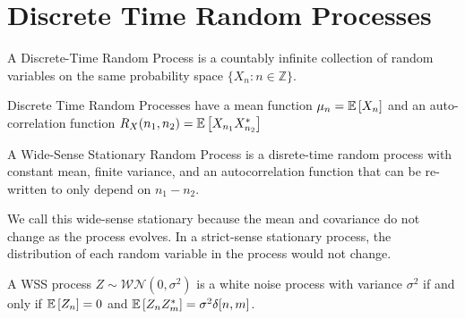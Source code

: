 \section{Discrete Time Random Processes}
\begin{definition}
	A Discrete-Time Random Process is a countably infinite collection of random variables on the same probability space $\{X_n: n\in\mathbb{Z}\}$.
	\label{defn:discrete-time-rp}
\end{definition}
Discrete Time Random Processes have a mean function $\mu_n = \mathbb{E}\left[X_n\right]$ and an auto-correlation function $R_X(n_1, n_2) = \mathbb{E}\left[X_{n_1}X_{n_2}^*\right]$
\begin{definition}
	A Wide-Sense Stationary Random Process is a disrete-time random process with constant mean, finite variance, and an autocorrelation function that can be re-written to only depend on $n_1-n_2$.
	\label{defn:wss-process}
\end{definition}
We call this wide-sense stationary because the mean and covariance do not change as the process evolves.
In a strict-sense stationary process, the distribution of each random variable in the process would not change.
\begin{definition}
	A WSS process $Z\sim \mathcal{WN}(0, \sigma^2)$ is a white noise process with variance $\sigma^2$ if and only if $\mathbb{E}\left[Z_n\right] = 0$ and $\mathbb{E}\left[Z_nZ_m^*\right] = \sigma^2\delta[n, m]$.
	\label{defn:white-noise-process}
\end{definition}
